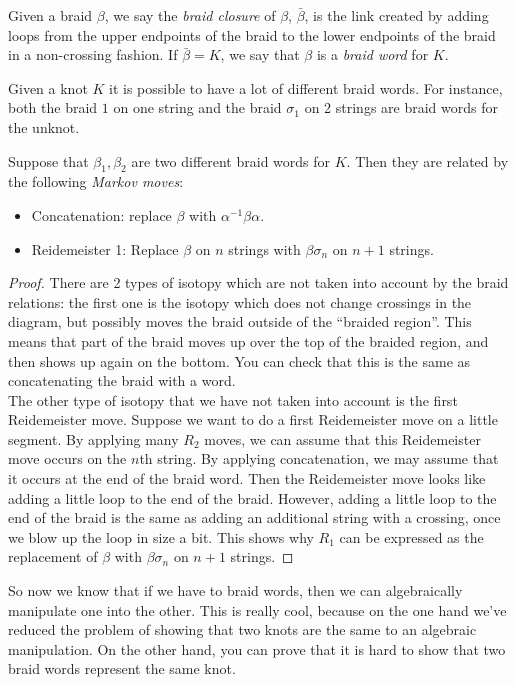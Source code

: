 \begin{definition}
Given a braid $\beta$, we say the \emph{braid closure} of $\beta$, $\bar \beta$, is the link created by adding loops from the upper endpoints of the braid to the lower endpoints of the braid in a non-crossing fashion. If $\bar \beta = K$, we say that $\beta$ is a \emph{braid word} for $K$. 
\end{definition}
Given a knot $K$ it is possible to have a lot of different braid words. For instance, both the braid $1$ on one string and the braid $\sigma_1$ on 2 strings are braid words for the unknot. \\
\begin{theorem}
Suppose that $\beta_1, \beta_2$ are two different braid words for $K$. Then they are related by the following \emph{Markov moves}:
\begin{itemize}
\item Concatenation: replace $\beta$ with $\alpha^{-1} \beta \alpha$.
\item Reidemeister 1: Replace $\beta$ on $n$ strings with $\beta\sigma_n$ on $n+1$ strings. 
\end{itemize}
\end{theorem}
\begin{proof}
There are 2 types of  isotopy which are not taken into account by the braid relations: the first one is the isotopy which does not change crossings in the diagram, but possibly moves the braid outside of the ``braided region''. This means that part of the braid moves up over the top of the braided region, and then shows up again on the bottom. You can check that this is the same as concatenating the braid with a word.\\
The other type of isotopy that we have not taken into account is the first Reidemeister move. Suppose we want to do a first Reidemeister move on a little segment. By applying many $R_2$ moves, we can assume that this Reidemeister move occurs on the $n$th string. By applying concatenation, we may assume that it occurs at the end of the braid word. Then the Reidemeister move looks like adding a little loop to the end of the braid. However, adding a little loop to the end of the braid is the same as adding an additional string with a crossing, once we blow up the loop in size a bit. This shows why $R_1$ can be expressed as the replacement of $\beta$ with $\beta \sigma_n$ on $n+1$ strings. 
\end{proof}
So now we know that if we have to braid words, then we can algebraically manipulate one into the other. This is really cool, because on the one hand we've reduced the problem of showing that two knots are the same to an algebraic manipulation. On the other hand, you can prove that it is hard to show that two braid words represent the same knot.\\
